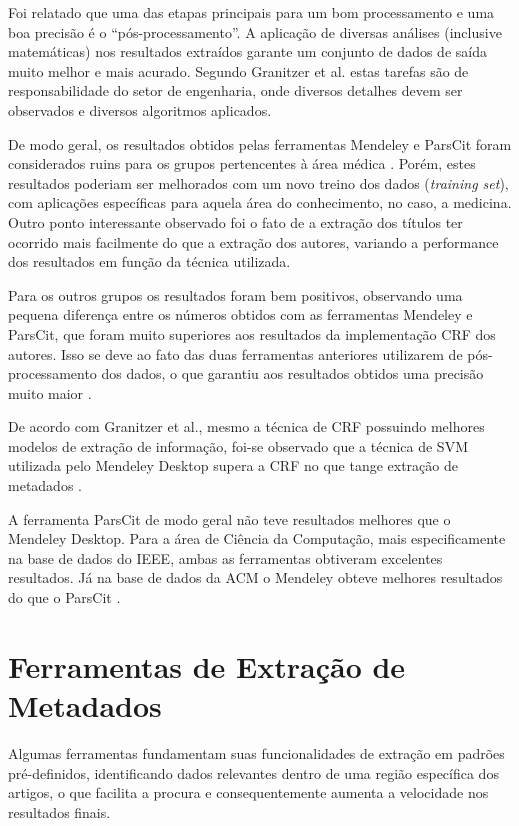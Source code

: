 Foi relatado que uma das etapas principais para um bom processamento e uma boa precisão é o ``pós-processamento''. A aplicação de diversas análises (inclusive matemáticas) nos resultados extraídos garante um conjunto de dados de saída muito melhor e mais acurado. Segundo Granitzer et al. \cite{Granitzer-2012-LayoutBased} estas tarefas são de responsabilidade do setor de engenharia, onde diversos detalhes devem ser observados e diversos algoritmos aplicados.

De modo geral, os resultados obtidos pelas ferramentas Mendeley e ParsCit foram considerados ruins para os grupos pertencentes à área médica \cite{Granitzer-2012-LayoutBased}. Porém, estes resultados poderiam ser melhorados com um novo treino dos dados (\emph{training set}), com aplicações específicas para aquela área do conhecimento, no caso, a medicina. Outro ponto interessante observado foi o fato de a extração dos títulos ter ocorrido mais facilmente do que a extração dos autores, variando a performance dos resultados em função da técnica utilizada.

Para os outros grupos os resultados foram bem positivos, observando uma pequena diferença entre os números obtidos com as ferramentas Mendeley e ParsCit, que foram muito superiores aos resultados da implementação CRF dos autores. Isso se deve ao fato das duas ferramentas anteriores utilizarem de pós-processamento dos dados, o que garantiu aos resultados obtidos uma precisão muito maior \cite{Granitzer-2012-LayoutBased}.

De acordo com Granitzer et al., mesmo a técnica de CRF possuindo melhores modelos de extração de informação, foi-se observado que a técnica de SVM utilizada pelo Mendeley Desktop supera a CRF no que tange extração de metadados \cite{Granitzer-2012-LayoutBased}.

A ferramenta ParsCit de modo geral não teve resultados melhores que o Mendeley Desktop. Para a área de Ciência da Computação, mais especificamente na base de dados do IEEE, ambas as ferramentas obtiveram excelentes resultados. Já na base de dados da ACM o Mendeley obteve melhores resultados do que o ParsCit \cite{Granitzer-2012-LayoutBased}.

\section{Ferramentas de Extração de Metadados}
\label{sec:environments}

Algumas ferramentas fundamentam suas funcionalidades de extração em padrões pré-definidos, identificando dados relevantes dentro de uma região específica dos artigos, o que facilita a procura e consequentemente aumenta a velocidade nos resultados finais.

